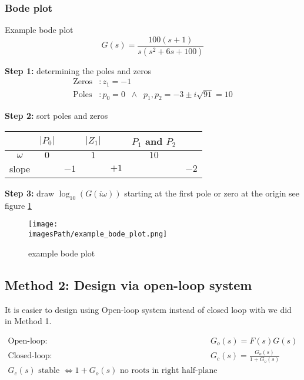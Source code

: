 \subsubsection{Bode plot}
\begin{exampleblock}{Example bode plot}
    \begin{equation*}
        G(s) = \frac{100(s+1)}{s(s^2 + 6s + 100)}
    \end{equation*}

    \textbf{Step 1:} determining the poles and zeros
    \begin{align*}
        \text{Zeros}&: z_1 = -1 \\
        \text{Poles}&: p_0 = 0 \;\; \land \;\; p_1,p_2 = -3\pm i\sqrt{91} = 10
    \end{align*}

    \textbf{Step 2:} sort poles and zeros
    \begin{center}
    \begin{tabular}{ c | c c c c c c } 
      & $|P_0|$ & & $|Z_1|$ & & $P_1$ and $P_2$ & \\ 
     \hline
     $\omega$ & $0$ & & $1$ & & $10$ & \\ 
     slope & & $-1$ & &  $+1$ & & $-2$ \\ 
    \end{tabular}
    \end{center}

    \textbf{Step 3:} draw $\log_{10}(G(i\omega))$ starting at the first pole or zero at the origin
    see figure \ref{fig:example_bode_pot}    
\end{exampleblock}
\begin{figure}[!h]
    \centering
    \texttt{[image: \\imagesPath/example\_bode\_plot.png]}
    \caption{example bode plot}
    \label{fig:example_bode_pot}
\end{figure}

\subsection{Method 2: Design via open-loop system}
It is easier to design using Open-loop system instead of closed loop with we did in Method 1.

\begin{align*}
    \text{Open-loop: }  &G_o(s) = F(s)G(s) \\
    \text{Closed-loop: }  &G_c(s) = \frac{G_o(s)}{1+G_o(s)} \\
    G_c(s) \text{ stable } \Leftrightarrow 1+G_o(s) \text{ no roots in right half-plane}
\end{align*}

